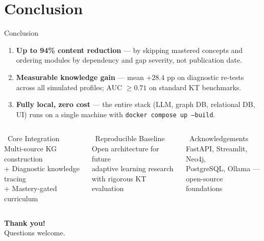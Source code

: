 \documentclass[aspectratio=169,9pt]{beamer}
\begin{document}
\section{Conclusion}

\begin{frame}{Conclusion}
\begin{keybox}[title={PathOptLearn in Three Points}]
  \begin{enumerate}
    \item \textbf{Up to 94\% content reduction} — by skipping mastered concepts and ordering modules by dependency and gap severity, not publication date.
    \item \textbf{Measurable knowledge gain} — mean $+28.4$ pp on diagnostic re-tests across all simulated profiles; AUC $\geq 0.71$ on standard KT benchmarks.
    \item \textbf{Fully local, zero cost} — the entire stack (LLM, graph DB, relational DB, UI) runs on a single machine with \texttt{docker compose up --build}.
  \end{enumerate}
\end{keybox}

\vspace{0.3cm}
\begin{columns}[T]
  \begin{block}{\faCogs\ Core Integration}
    \small
    Multi-source KG construction\\
    + Diagnostic knowledge tracing\\
    + Mastery-gated curriculum
  \end{block}

  \begin{block}{\faDatabase\ Reproducible Baseline}
    \small
    Open architecture for future\\
    adaptive learning research\\
    with rigorous KT evaluation
  \end{block}

  \begin{block}{\faHeart\ Acknowledgements}
    \small
    FastAPI, Streamlit, Neo4j,\\
    PostgreSQL, Ollama —\\
    open-source foundations
  \end{block}
\end{columns}

\vspace{0.4cm}
\centering
\large\textbf{Thank you!}\\
\small\textcolor{mygray}{Questions welcome.}
\end{frame}
\end{document}
